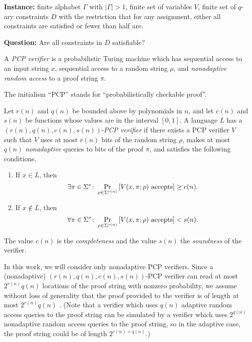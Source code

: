 \documentclass{article}
\begin{document}
\begin{definition}
  \mbox{}

  \textbf{Instance:} finite alphabet $\Gamma$ with $|\Gamma| > 1$, finite set of variables $V$, finite set of $q$-ary constraints $D$ with the restriction that for any assignment, either all constraints are satisfied or fewer than half are.

  \textbf{Question:} Are all constraints in $D$ satisfiable?
\end{definition}

\begin{definition}
  A \emph{PCP verifier} is a probabilistic Turing machine which has sequential access to an input string $x$, sequential access to a random string $\rho$, and \emph{nonadaptive random access} to a proof string $\pi$.
\end{definition}

The initialism ``PCP'' stands for ``probabilistically checkable proof''.

\begin{definition}
  Let $r(n)$ and $q(n)$ be bounded above by polynomials in $n$, and let $c(n)$ and $s(n)$ be functions whose values are in the interval $[0, 1]$.
  A language $L$ has a $(r(n), q(n), c(n), s(n))$-\emph{PCP verifier} if there exists a PCP verifier $V$ such that $V$ uses at most $r(n)$ bits of the random string $\rho$, makes at most $q(n)$ \emph{nonadaptive} queries to bits of the proof $\pi$, and satisfies the following conditions.
  \begin{enumerate}
  \item If $x \in L$, then
    \begin{equation*}
      \exists \pi \in \Sigma^* \colon \Pr_{\rho \in \Sigma^{r(n)}}{\left[V(x, \pi; \rho) \textnormal{ accepts}\right]} \geq c(n).
    \end{equation*}
  \item If $x \notin L$, then
    \begin{equation*}
      \forall \pi \in \Sigma^* \colon \Pr_{\rho \in \Sigma^{r(n)}}{\left[V(x, \pi; \rho) \textnormal{ accepts}\right]} < s(n).
    \end{equation*}
  \end{enumerate}
  The value $c(n)$ is the \emph{completeness} and the value $s(n)$ the \emph{soundness} of the verifier.
\end{definition}

In this work, we will consider only nonadaptive PCP verifiers.
Since a (nonadaptive) $(r(n), q(n), c(n), s(n))$-PCP verifier can read at most $2^{r(n)} q(n)$ locations of the proof string with nonzero probability, we assume without loss of generality that the proof provided to the verifier is of length at most $2^{r(n)} q(n)$ \cite[Remark~11.6]{ab09}.
(Note that a verifier which uses $q(n)$ adaptive random access queries to the proof string can be simulated by a verifier which uses $2^{q(n)}$ nonadaptive random access queries to the proof string, so in the adaptive case, the proof string could be of length $2^{r(n) + q(n)}$.)
\end{document}
